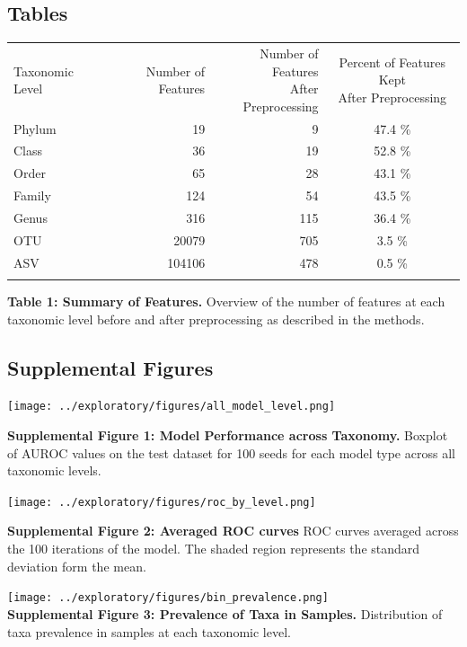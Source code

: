 \documentclass[
]{article}
\begin{document}
\newpage

\hypertarget{tables}{%
\subsection{Tables}\label{tables}}

\begin{longtable}[]{@{}lrrc@{}}
\toprule
Taxonomic Level & Number of Features &
\makecell[c]{Number of Features \\ After Preprocessing} &
\makecell[c]{Percent of Features Kept \\ After Preprocessing} \\ \addlinespace
\midrule
\endhead
Phylum & 19 & 9 & 47.4 \% \\ \addlinespace
Class & 36 & 19 & 52.8 \% \\ \addlinespace
Order & 65 & 28 & 43.1 \% \\ \addlinespace
Family & 124 & 54 & 43.5 \% \\ \addlinespace
Genus & 316 & 115 & 36.4 \% \\ \addlinespace
OTU & 20079 & 705 & 3.5 \% \\ \addlinespace
ASV & 104106 & 478 & 0.5 \% \\ \addlinespace
\bottomrule
\end{longtable}

\textbf{Table 1: Summary of Features.} Overview of the number of
features at each taxonomic level before and after preprocessing as
described in the methods.

\newpage

\hypertarget{supplemental-figures}{%
\subsection{Supplemental Figures}\label{supplemental-figures}}

\texttt{[image: ../exploratory/figures/all\_model\_level.png]}

\textbf{Supplemental Figure 1: Model Performance across Taxonomy.}
Boxplot of AUROC values on the test dataset for 100 seeds for each model
type across all taxonomic levels.

\texttt{[image: ../exploratory/figures/roc\_by\_level.png]}

\textbf{Supplemental Figure 2: Averaged ROC curves} ROC curves averaged
across the 100 iterations of the model. The shaded region represents the
standard deviation form the mean.

\texttt{[image: ../exploratory/figures/bin\_prevalence.png]}\\
\textbf{Supplemental Figure 3: Prevalence of Taxa in Samples.}
Distribution of taxa prevalence in samples at each taxonomic level.
\end{document}
